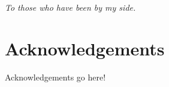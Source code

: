 \thispagestyle{empty}

\begin{flushright}
\emph{\scriptsize{
To those who have been by my side.
}}\end{flushright}

\clearpage
\thispagestyle{empty}
\null\newpage
\clearpage

\chapter*{Acknowledgements}
\thispagestyle{empty}

Acknowledgements go here!

\clearpage
\thispagestyle{empty}
\null\newpage
\clearpage
